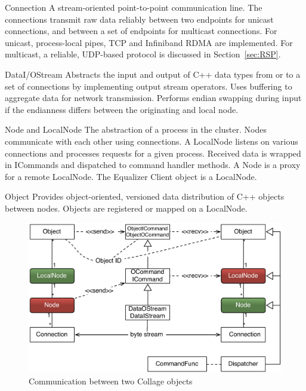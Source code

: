 \documentclass[10pt,journal,compsoc]{IEEEtran}
\newcommand{\sref}[1]{Section~\ref{#1}}
\begin{document}
\begin{compactdesc}
\item[Connection] A stream-oriented point-to-point communication
  line. The connections
  transmit raw data reliably between two endpoints for unicast connections, and
  between a set of endpoints for multicast connections. For unicast,
  process-local pipes, TCP and Infiniband RDMA are implemented. For multicast,
  a reliable, UDP-based protocol is discussed in \sref{sec:RSP}.
\item[DataI/OStream] Abstracts the input and output of C++ data types from or to
  a set of connections by implementing output stream operators. Uses buffering
  to aggregate data for network transmission. Performs endian swapping during
  input if the endianness differs between the originating and local node.
\item[Node and LocalNode] The abstraction of a process in the cluster. Nodes
  communicate with each other using connections. A LocalNode listens on various
  connections and processes requests for a given process. Received data is
  wrapped in ICommands and dispatched to command handler methods. A Node is a
  proxy for a remote LocalNode. The \textsf{Equalizer} Client object is a
LocalNode.
\item[Object] Provides object-oriented, versioned data distribution of C++
  objects between nodes. Objects are registered or mapped on a Local\-Node.
\end{compactdesc}

\begin{figure}[ht]\center
  \includegraphics[width=\columnwidth]{images/netObject}
  \caption{\label{fNetObject}Communication between two \textsf{Collage} objects}
\end{figure}
\end{document}
